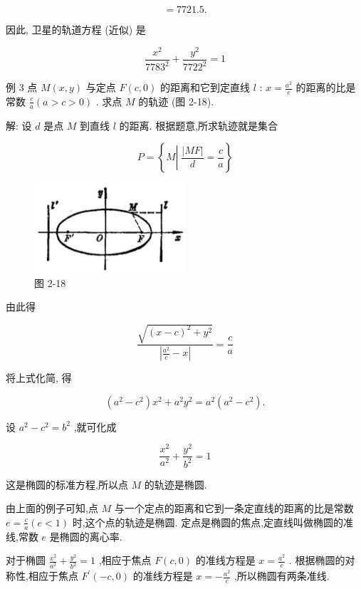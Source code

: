 \documentclass[lang=cn,newtx,10pt,scheme=chinese]{elegantbook}
\begin{document}
\[
  = {7721.5}\text{.}
\]

因此, 卫星的轨道方程 (近似) 是

\[
  \frac{{x}^{2}}{{7783}^{2}} + \frac{{y}^{2}}{{7722}^{2}} = 1
\]

例 3 点 \(M\left( {x,y}\right)\) 与定点 \(F\left( {c,0}\right)\) 的距离和它到定直线 \(l\) : \(x = \frac{{a}^{2}}{c}\) 的距离的比是常数 \(\frac{c}{a}\left( {a > c > 0}\right)\) . 求点 \(M\) 的轨迹 (图 2-18).

解: 设 \(d\) 是点 \(M\) 到直线 \(l\) 的距离. 根据题意,所求轨迹就是集合

\[
  P = \left\{ {M\left| {\;\frac{\left| MF\right| }{d} = \frac{c}{a}}\right. }\right\}
\]

\begin{figure}[h]
  \centering
  \includegraphics[max width=0.5\textwidth]{images/01912cc2-ffb6-728e-9ae7-b113ff05c64b_93_181051.jpg}
  \caption{图 2-18}
\end{figure}



由此得

\[
  \frac{\sqrt{{\left( x - c\right) }^{2} + {y}^{2}}}{\left| \frac{{a}^{2}}{c} - x\right| } = \frac{c}{a}
\]

将上式化简, 得

\[
  \left( {{a}^{2} - {c}^{2}}\right) {x}^{2} + {a}^{2}{y}^{2} = {a}^{2}\left( {{a}^{2} - {c}^{2}}\right) .
\]

设 \({a}^{2} - {c}^{2} = {b}^{2}\) ,就可化成

\[
  \frac{{x}^{2}}{{a}^{2}} + \frac{{y}^{2}}{{b}^{2}} = 1
\]

这是椭圆的标准方程,所以点 \(M\) 的轨迹是椭圆.

由上面的例子可知,点 \(M\) 与一个定点的距离和它到一条定直线的距离的比是常数 \(e = \frac{c}{a}\left( {e < 1}\right)\) 时,这个点的轨迹是椭圆. 定点是椭圆的焦点,定直线叫做椭圆的准线,常数 \(e\) 是椭圆的离心率.

对于椭圆 \(\frac{{x}^{2}}{{a}^{2}} + \frac{{y}^{2}}{{b}^{2}} = 1\) ,相应于焦点 \(F\left( {c,0}\right)\) 的准线方程是 \(x = \frac{{a}^{2}}{c}\) . 根据椭圆的对称性,相应于焦点 \({F}^{\prime }\left( {-c,0}\right)\) 的准线方程是 \(x = - \frac{{a}^{2}}{c}\) ,所以椭圆有两条准线.
\end{document}
